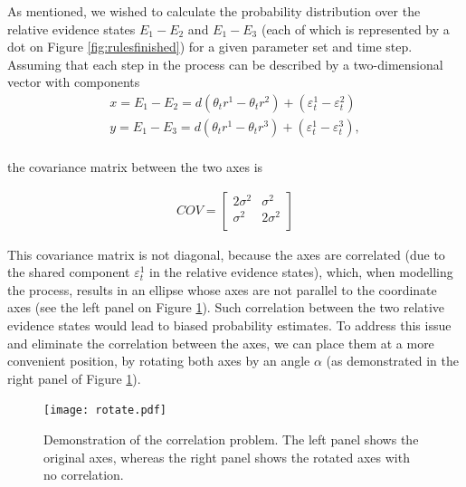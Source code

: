 \documentclass[11pt,a4paper]{article}
\begin{document}
As mentioned, we wished to calculate the probability distribution over the relative evidence states $E_{1}-E_{2}$ and $E_{1}-E_{3}$ (each of which is represented by a dot on Figure \ref{fig:rulesfinished}) for a given parameter set and time step. Assuming that each step in the process can be described by a two-dimensional vector with components
\begin{equation}
\begin{array}{l}
\displaystyle x = E_{1}-E_{2} = d(\theta_{t}r^1-\theta_{t}r^2) + (\varepsilon_{t}^{1}-\varepsilon_{t}^{2})\\
\displaystyle y = E_{1}-E_{3} = d(\theta_{t}r^1-\theta_{t}r^3) + (\varepsilon_{t}^{1}-\varepsilon_{t}^{3}),\\
\end{array} 
\label{eq:axes1}
\end{equation}

the covariance matrix between the two axes is

\begin{equation}
\begin{array}{l}
COV = \begin{bmatrix}
       2\sigma^2 & \sigma^2 \\[0.3em]
       \sigma^2 & 2\sigma^2 \\[0.3em]
     \end{bmatrix}
\end{array} 
\label{eq:covariance}
\end{equation}

This covariance matrix is not diagonal, because the axes are correlated (due to the shared component $\varepsilon_{t}^{1}$ in the relative evidence states), which, when modelling the process, results in an ellipse whose axes are not parallel to the coordinate axes (see the left panel on Figure \ref{fig:rotate}). Such correlation between the two relative evidence states would lead to biased probability estimates. To address this issue and eliminate the correlation between the axes, we can place them at a more convenient position, by rotating both axes by an angle $\alpha$ (as demonstrated in the right panel of Figure \ref{fig:rotate}). 

\begin{figure}[htb!]
\captionsetup{justification=centering}
\centering
\caption{Demonstration of the correlation problem. The left panel shows the original axes, whereas the right panel shows the rotated axes with no correlation.}
\texttt{[image: rotate.pdf]}
\label{fig:rotate}
\end{figure}
 
\end{document}
